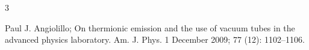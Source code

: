 \begin{thebibliography}{3}


Paul J. Angiolillo; On thermionic emission and the use of vacuum tubes in the advanced physics laboratory. Am. J. Phys. 1 December 2009; 77 (12): 1102–1106.
\end{thebibliography}